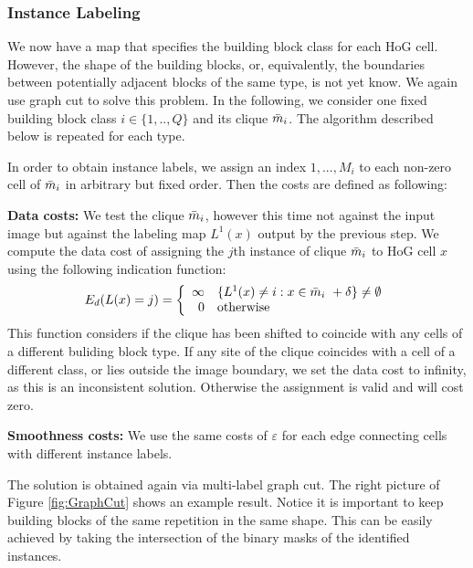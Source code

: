 \documentclass{acmtog}
\begin{document}
\subsubsection{Instance Labeling}

We now have a map that specifies the building block class for each HoG cell. However, the shape of the building blocks, or, equivalently, the boundaries between potentially adjacent blocks of the same type, is not yet know. We again use graph cut to solve this problem. In the following, we consider one fixed building block class $i \in \{1,..,Q\}$ and its clique $\bar{m}_i$. The algorithm described below is repeated for each type. 

In order to obtain instance labels, we assign an index $1,...,M_i$ to each non-zero cell of $\bar{m}_i$ in arbitrary but fixed order. Then the costs are defined as following:


\textbf{Data costs:} We test the clique $\bar{m}_i$, however this time not against the input image but against the labeling map $L^{1}(x)$ output by the previous step. We compute the data cost of assigning the $j$th instance of clique $\bar{m}_i$ to HoG cell $x$ using the following indication function: 
\begin{equation}
E_{d}(L(x) = j) = \left\{
\begin{array}{rl}
\infty &  \{L^{1}(x) \neq i:x \in \bar{m}_i\ + \delta \}  \neq \emptyset\\
0 & \text{otherwise }
\end{array} \right.
\label{eq:gc2data}
\end{equation}
%
This function considers if the clique has been shifted to coincide with any cells of a different buliding block type. If any site of the clique coincides with a cell of a different class, or lies outside the image boundary, we set the data cost to infinity, as this is an inconsistent solution. Otherwise the assignment is valid and will cost zero.

\textbf{Smoothness costs:} We use the same costs of $\varepsilon$ for each edge connecting cells with different instance labels.

The solution is obtained again via multi-label graph cut. The right picture of Figure \ref{fig:GraphCut} shows an example result. Notice it is important to keep building blocks of the same repetition in the same shape. This can be easily achieved by taking the intersection of the binary masks of the identified instances.  
\end{document}
